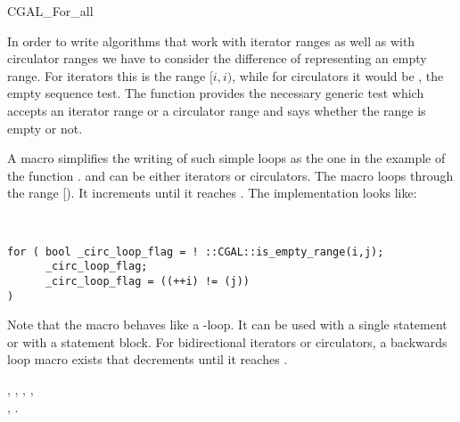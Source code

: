 
\begin{ccRefMacro}{CGAL_For_all}


\ccDefinition

In order to write algorithms that work with iterator ranges as well as
with circulator ranges we have to consider the difference of
representing an empty range. For iterators this is the range $[i,i)$,
while for circulators it would be , the empty sequence test.
The function  provides the necessary generic test
which accepts an iterator range or a circulator range and says whether
the range is empty or not.


A macro  simplifies the writing of such simple
loops as the one in the example of the function .
 and  can be either iterators or circulators. The macro
loops through the range [). It increments  until it
reaches . The implementation looks like:

  \ \ \ccTexHtml{$\equiv$}{:=} \ \
\begin{minipage}[t]{0.74\textwidth}
\begin{verbatim}
for ( bool _circ_loop_flag = ! ::CGAL::is_empty_range(i,j);
      _circ_loop_flag;
      _circ_loop_flag = ((++i) != (j)) 
)
\end{verbatim}
\end{minipage}%

Note that the macro behaves like a -loop. It can be used with
a single statement or with a statement block.  For bidirectional
iterators or circulators,  a backwards loop macro
 exists that decrements  until
it reaches \ccc{i}.


\ccSeeAlso

,
,
,
,\\
,
.


\end{ccRefMacro}

